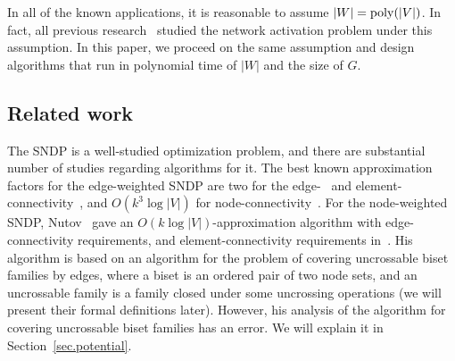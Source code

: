 \documentclass[11pt]{article}
\begin{document}
In all of the known applications, it is reasonable to assume 
$|W|={\rm poly}(|V|)$.
In fact, all previous research~\cite{Nutov13activation,Panigrahi11wireless} studied the network activation problem 
under this assumption.
In this paper, we proceed on the same assumption and 
design algorithms
that run in polynomial time of $|W|$ and the size of $G$.

\subsection{Related work} 

The SNDP is a well-studied optimization
problem, and there are substantial number of studies regarding algorithms for
it. The best known approximation factors for the edge-weighted SNDP are two
for the edge-~\cite{Jain01} and element-connectivity~\cite{FleischerJW06},
and $O(k^3 \log |V|)$ for node-connectivity~\cite{ChuzhoyK12}. 
For the node-weighted SNDP, 
Nutov~\cite {Nutov10node-weights} gave an $O(k\log |V|)$-approximation algorithm with edge-connectivity requirements, and
element-connectivity requirements in~\cite{Nutov12uncrossable}. His algorithm
is based on an algorithm for the problem of covering uncrossable biset
families by edges, where a biset is an ordered pair of two node sets, and an uncrossable family 
is a family closed under some uncrossing operations (we will present their formal definitions later). 
However, his analysis of the
algorithm for covering uncrossable biset families has an error.
We will explain it in Section~\ref{sec.potential}.
\end{document}
